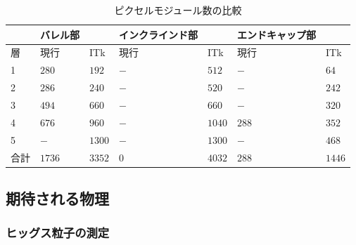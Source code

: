 \begin{table}[tbp]
\begin{center}
\caption[ピクセルモジュール数の比較]{ピクセルモジュール数の比較}
\label{compare_itk_modules}
  \begin{tabular}{|l||ll|ll|ll|} \hline
          & バレル部 &            & インクラインド部 & & エンドキャップ部 & \\ \hline 
    層    & 現行     & ITk        & 現行& ITk          & 現行  & ITk \\ \hline
    1     & $280$    & $192$      & $-$ & $512$        & $-$   & $64$ \\ 
    2     & $286$    & $240$      & $-$ & $520$        & $-$   & $242$ \\ 
    3     & $494$    & $660$      & $-$ & $660$        & $-$   & $320$ \\ 
    4     & $676$    & $960$      & $-$ & $1040$       & $288$ & $352$ \\ 
    5     & $-$      & $1300$     & $-$ & $1300$       & $-$   & $468$ \\ \hline
    合計  & $1736$   & $3352$     & $0$ & $4032$       & $288$ & $1446$ \\ \hline\hline
  \end{tabular}
\end{center}
\end{table}

\subsection{期待される物理}
\subsubsection{ヒッグス粒子の測定}

